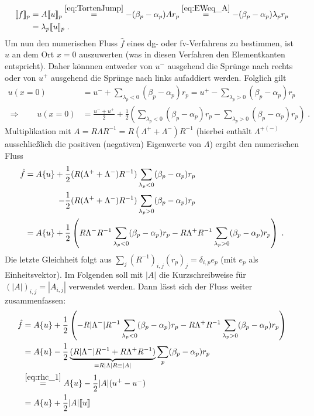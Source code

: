 \begin{equation}
  \begin{aligned}
    \llbracket f \rrbracket_p &= A\llbracket u \rrbracket_p \stackrel{\eqref{eq:TortenJump}}{=} -(\beta_p - \alpha_p) A r_p \stackrel{\eqref{eq:EWeq_A}}{=}  -(\beta_p - \alpha_p) \lambda_p r_p \\
    &= \lambda_p \llbracket u \rrbracket_p \; .
  \end{aligned}
\end{equation}
Um nun den numerischen Fluss $\hat{f}$ eines \ac{dg}- oder \ac{fv}-Verfahrens zu bestimmen, ist $u$ an dem Ort $x=0$ auszuwerten (was in diesen Verfahren den Elementkanten entspricht). Daher könnnen entweder von $u^-$ ausgehend die Sprünge nach rechts oder von $u^+$ ausgehend die Sprünge nach links aufaddiert  werden. Folglich gilt
\begin{align}
  \label{eq:rhc_1}
  u(x=0) &= u^- + \sum_{\lambda_p < 0} (\beta_p - \alpha_p)r_p = u^+ - \sum_{\lambda_p > 0} (\beta_p - \alpha_p)r_p \\
  \Rightarrow \qquad u(x=0) &= \frac{u^- + u^+}{2} + \frac{1}{2}\left( \sum_{\lambda_p < 0} (\beta_p - \alpha_p)r_p - \sum_{\lambda_p > 0} (\beta_p - \alpha_p)r_p \right) \; .
\end{align}
Multiplikation mit $A=R\Lambda R^{-1} = R(\Lambda^+ + \Lambda^-)R^{-1}$ (hierbei enthält $\Lambda^{+(-)}$ ausschließlich die positiven (negativen) Eigenwerte von $\Lambda$) ergibt den numerischen Fluss
\begin{align*}
  \hat{f} = A \{ u \} + \frac{1}{2}& (R(\Lambda^+ + \Lambda^-)R^{-1}) \sum_{\lambda_p < 0} (\beta_p - \alpha_p)r_p \\
                     - \frac{1}{2}& (R(\Lambda^+ + \Lambda^-)R^{-1}) \sum_{\lambda_p > 0} (\beta_p - \alpha_p)r_p \\
         = A \{ u \} + \frac{1}{2}&\left( R\Lambda^-R^{-1} \sum_{\lambda_p < 0} (\beta_p - \alpha_p)r_p
                    - R\Lambda^+R^{-1} \sum_{\lambda_p > 0} (\beta_p - \alpha_p)r_p        \right) \; .
\end{align*}
Die letzte Gleichheit folgt aus $\sum_j (R^{-1})_{i,j} (r_p)_j = \delta_{i,p} e_p$ (mit $e_p$ als Einheitsvektor). Im Folgenden soll mit $|A|$ die Kurzschreibweise für $(|A|)_{i,j} = |A_{i,j}|$ verwendet werden. Dann lässt sich der Fluss weiter zusammenfassen:
\begin{align}
  \hat{f} &= A \{ u \} + \frac{1}{2} \left( -R|\Lambda^-|R^{-1} \sum_{\lambda_p < 0} (\beta_p - \alpha_p)r_p
              - R\Lambda^+R^{-1} \sum_{\lambda_p > 0} (\beta_p - \alpha_p)r_p        \right) \\
        &= A \{ u \} - \frac{1}{2} \underbrace{(R|\Lambda^-|R^{-1} + R\Lambda^+R^{-1})}_{=R|\Lambda|R \equiv |A|}  \sum_p(\beta_p - \alpha_p)r_p   \\
        &\stackrel{\eqref{eq:rhc_1}}{=} A \{ u \} - \frac{1}{2} |A| (u^+-u^-) \\
        &= A \{ u \} + \frac{1}{2} |A| \llbracket u \rrbracket
\end{align}
